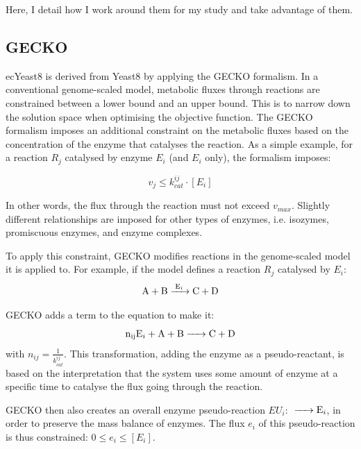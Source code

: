 Here, I detail how I work around them for my study and take advantage of them.

\subsection{GECKO}
\label{subsec:model-yeast8-gecko}

ecYeast8 is derived from Yeast8 by applying the GECKO formalism.
In a conventional genome-scaled model, metabolic fluxes through reactions are constrained between a lower bound and an upper bound.
This is to narrow down the solution space when optimising the objective function.
The GECKO formalism imposes an additional constraint on the metabolic fluxes based on the concentration of the enzyme that catalyses the reaction.
As a simple example, for a reaction $R_{j}$ catalysed by enzyme $E_{i}$ (and $E_{i}$ only), the formalism imposes:

\begin{equation}
  v_{j} \le k_{cat}^{ij} \cdot [E_{i}]
\end{equation}

In other words, the flux through the reaction must not exceed $v_{max}$.
Slightly different relationships are imposed for other types of enzymes, i.e. isozymes, promiscuous enzymes, and enzyme complexes.

To apply this constraint, GECKO modifies reactions in the genome-scaled model it is applied to.
For example, if the model defines a reaction $R_{j}$ catalysed by $E_{i}$:
\begin{equation}
  \ce{ A + B ->[E_{i}] C + D }
\end{equation}

GECKO adds a term to the equation to make it:
\begin{equation}
  \ce{ n_{ij}E_{i} + A + B -> C + D }
\end{equation}
with $n_{ij} = \frac{1}{k_{cat}^{ij}}$.
This transformation, adding the enzyme as a pseudo-reactant, is based on the interpretation that the system uses some amount of enzyme at a specific time to catalyse the flux going through the reaction.

GECKO then also creates an overall enzyme pseudo-reaction $EU_{i}$: $\ce{ -> E_{i}}$, in order to preserve the mass balance of enzymes.  The flux $e_{i}$ of this pseudo-reaction is thus constrained: $0 \le e_{i} \le [E_{i}]$.


